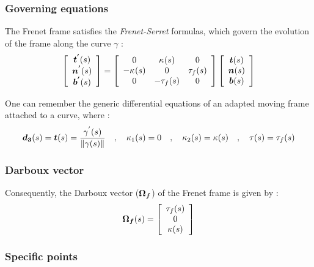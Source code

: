 \subsubsection{Governing equations}
The Frenet frame satisfies the \emph{Frenet-Serret} formulas, which govern the evolution of the frame along the curve $\gamma$ :
\begin{gather}
\left[\begin{array}{c}
\boldsymbol{t^{'}}(s) \\
\boldsymbol{n^{'}}(s) \\
\boldsymbol{b^{'}}(s)
\end{array}\right]
=
\left[\begin{array}{ccc}
0 & \kappa_{}(s) & 0 \\
-\kappa_{}(s) & 0 & \tau_f(s) \\
0 & -\tau_f(s) & 0
\end{array}\right]
\left[\begin{array}{c}
\boldsymbol{t}(s) \\
\boldsymbol{n}(s) \\
\boldsymbol{b}(s)
\end{array}\right]
\end{gather}

One can remember the generic differential equations of an adapted moving frame attached to a curve, where :
\begin{gather}
\boldsymbol{d_{3}}(s) = \boldsymbol{t}(s) = \frac{\gamma^{'}(s)}{\|\gamma(s)\|}
\quad,\quad
\kappa_{1}(s) = 0
\quad,\quad
\kappa_{2}(s) = \kappa(s)
\quad,\quad
\tau(s) = \tau_{f}(s)
\end{gather}



\subsubsection{Darboux vector}
Consequently, the Darboux vector ($\boldsymbol{\Omega_{f}}$) of the Frenet frame is given by :
\begin{gather}
\boldsymbol{\Omega_f}(s)
=
\left[\begin{array}{c}
\tau_{f}(s) \\
0 \\
\kappa(s)
\end{array}\right]
\end{gather}


\subsubsection{Specific points}

